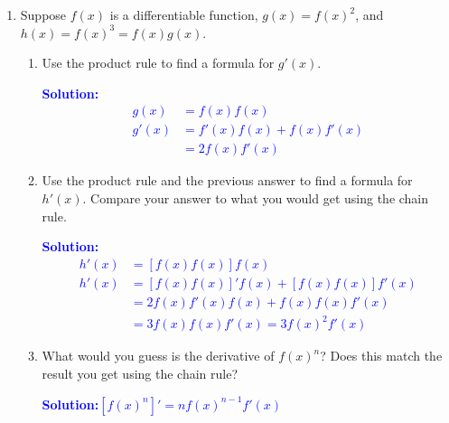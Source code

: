 \documentclass[letterpaper,11pt]{article}
\newcommand{\sol}[2]{\begin{minipage}[c][#1]{\linewidth}{\textcolor{blue}{\textbf{Solution:}}\quad \textcolor{blue}{#2}}\end{minipage}}
\newcommand{\sol}[2]{\begin{minipage}[c][#1]{\linewidth}{\vfill}\end{minipage}}
\begin{document}
\begin{enumerate}
\begin{multicols}{3}
\end{multicols}

\begin{enumerate}
\item Let $h(x)=g(f(x))$. Find $h'(3)$.

\sol{1 in}{$h'(3)=g'(f(3)) \cdot f'(3)=g'(1) \cdot f'(3)=2 \cdot 6=12$}

\item Let $k(x)=f(g(x))$.  Find $k'(1)$.

\sol{1in}{$k'(1)=f'(g(1)) \cdot g'(1)=f'(2) \cdot g'(1)=5 \cdot 2=10$.}



\end{enumerate}
\newpage
\item Suppose $f(x)$ is a differentiable function, $g(x)=f(x)^2$, and $h(x)=f(x)^3 = f(x)g(x)$.

\begin{enumerate}
\item Use the product rule to find a formula for $g'(x)$.

\sol{1.5 in}{
\begin{align*}
g(x)&=f(x)f(x) \\
g'(x)&=f'(x)f(x)+f(x)f'(x) \\
&=2f(x)f'(x)
\end{align*}}
\item Use the product rule and the previous answer to find a formula for $h'(x)$.   Compare your answer to what you would get using the chain rule.

\sol{1.5in}{
\begin{align*}
h'(x)&=[f(x)f(x)]f(x) \\
h'(x)&=[f(x)f(x)]'f(x)+[f(x)f(x)]f'(x) \\
&=2f(x)f'(x)f(x)+f(x)f(x)f'(x) \\
&=3f(x)f(x)f'(x)=3f(x)^2f'(x)
\end{align*}}
\item What would you guess is the derivative of $f(x)^n$?  Does this match the result you get using the chain rule?

\sol{.5 in}{$[f(x)^n]'=nf(x)^{n-1}f'(x)$}

\end{enumerate}
\end{enumerate}
\end{document}
